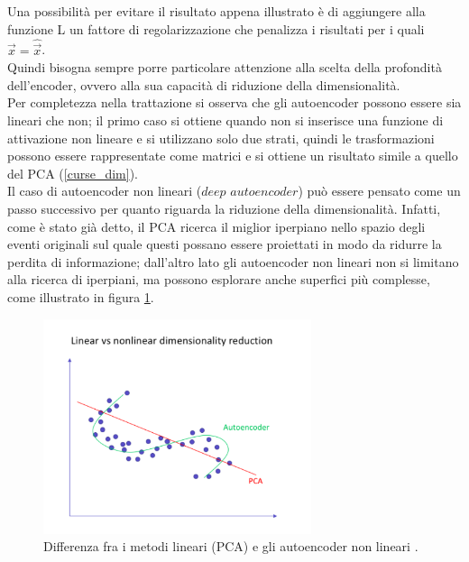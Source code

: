 Una possibilità per evitare il risultato appena illustrato è di aggiungere alla funzione L un fattore di regolarizzazione che penalizza i risultati per i quali $\vec{x} = \hat{\vec{x}}$. \\
Quindi bisogna sempre porre particolare attenzione alla scelta della profondità dell'encoder, ovvero alla sua capacità di riduzione della dimensionalità. \\
Per completezza nella trattazione si osserva che gli autoencoder possono essere sia lineari che non; il primo caso si ottiene quando non si inserisce una funzione di attivazione non lineare e si utilizzano solo due strati, quindi le trasformazioni possono essere rappresentate come matrici e si ottiene un risultato simile a quello del PCA (\ref{curse_dim}). \\
Il caso di autoencoder non lineari ($\textit{deep autoencoder}$) può essere pensato come un passo successivo per quanto riguarda la riduzione della dimensionalità. Infatti, come è stato già detto, il PCA ricerca il miglior iperpiano nello spazio degli eventi originali sul quale questi possano essere proiettati in modo da ridurre la perdita di informazione; dall'altro lato gli autoencoder non lineari non si limitano alla ricerca di iperpiani, ma possono esplorare anche superfici più complesse, come illustrato in figura \ref{autoencoder_non_lineari}.

\begin{figure}[h!]
	\centering
	\includegraphics[width=0.70\textwidth]{figs/Autoencoder_non_lineari.png}
	\caption{Differenza fra i metodi lineari (PCA) e gli autoencoder non lineari \cite{Autoencoders}.}
	\label{autoencoder_non_lineari}
\end{figure}


\newpage


